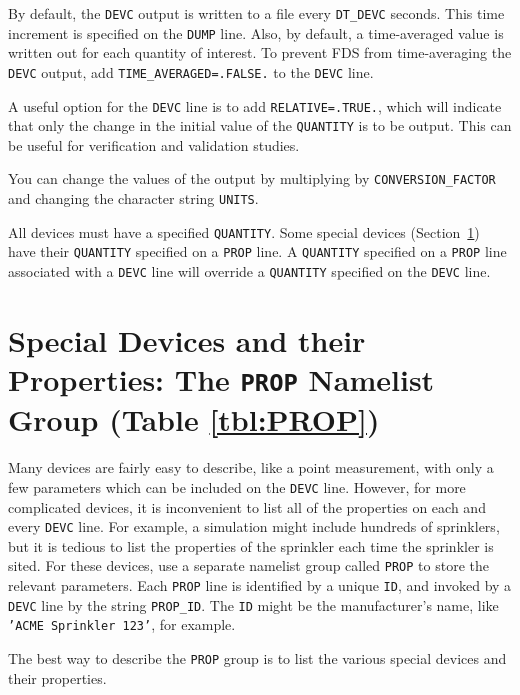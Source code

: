 \documentclass[11pt]{book}
\newcommand{\ct}{\tt\small}
\begin{document}
By default, the {\ct DEVC} output is written to a file every {\ct DT\_DEVC} seconds.
This time increment is specified on the {\ct DUMP} line. Also, by default,
a time-averaged value is written out for each quantity of interest. To prevent FDS from time-averaging the {\ct DEVC} output, add
{\ct TIME\_AVERAGED=.FALSE.} to the {\ct DEVC} line.

A useful option for the {\ct DEVC} line is to add {\ct RELATIVE=.TRUE.}, which will indicate that only the change in
the initial value of the {\ct QUANTITY} is to be output. This can be useful for verification and validation studies.

You can change the values of the output by multiplying by {\ct CONVERSION\_FACTOR} and changing the character string {\ct UNITS}.


\begin{warning}
All devices must have a specified {\ct QUANTITY}.  Some special devices (Section~\ref{info:PROP}) have their {\ct QUANTITY}
specified on a {\ct PROP} line.
A {\ct QUANTITY} specified on a {\ct PROP} line associated with a {\ct DEVC} line will override a {\ct QUANTITY}
specified on the {\ct DEVC} line.
\end{warning}


\newpage

\section{Special Devices and their Properties: The \texorpdfstring{{\tt PROP}}{PROP} Namelist Group (Table \ref{tbl:PROP})}
\label{info:PROP}

Many devices are fairly easy to describe, like a point measurement, with only a few parameters which can be included on the
{\ct DEVC} line. However, for more complicated devices, it is inconvenient to list all of the properties on each and every
{\ct DEVC} line. For example, a simulation might include hundreds of sprinklers, but it is tedious to list the properties of the
sprinkler each time the sprinkler is sited. For these devices, use a separate namelist group called {\ct PROP} to store the relevant parameters.
Each {\ct PROP} line is identified by a unique {\ct ID}, and invoked by a {\ct DEVC} line by the string {\ct PROP\_ID}.
The {\ct ID} might be the manufacturer's
name, like {\ct 'ACME Sprinkler 123'}, for example.

The best way to describe the {\ct PROP} group is to list the various special devices and their properties.
\end{document}
